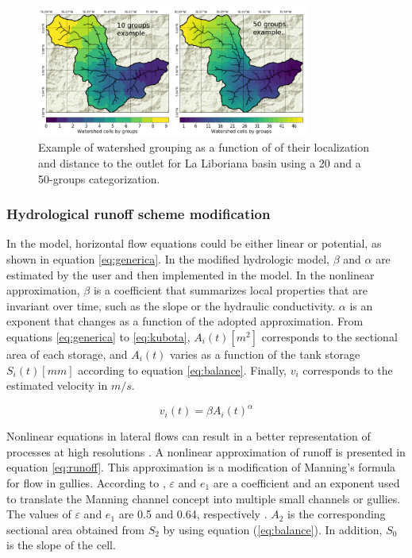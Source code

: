 \documentclass[hess, manuscript]{copernicus}
\begin{document}
\begin{figure}[t!]
\centering
 \includegraphics[width=9cm]{Figures/Mapas_Grupos.png}
 \caption{Example of watershed grouping as a function of of their localization and distance to the outlet for La Liboriana basin using a 20 and a 50-groups categorization.}
    \label{fig:groupsexample}
\end{figure}


\subsubsection{Hydrological runoff scheme modification}

In the model, horizontal flow equations could be either linear or potential, as shown in equation \ref{eq:generica}. In the modified hydrologic model, $\beta$ and $\alpha$ are estimated by the user and then implemented in the model. In the nonlinear approximation, $\beta$ is a coefficient that summarizes local properties that are invariant over time, such as the slope or the hydraulic conductivity. $\alpha$ is an exponent that changes as a function of the adopted approximation. From equations \ref{eq:generica} to \ref{eq:kubota}, $A_i(t) [m^2]$ corresponds to the sectional area of each storage, and $A_i(t)$ varies as a function of the tank storage $S_i(t) [mm]$ according to equation \ref{eq:balance}. Finally, $v_{i}$ corresponds to the estimated velocity in $m/s$.

\begin{equation}
 v_{i}(t) = \beta A_i(t) ^{\alpha} 
    \label{eq:generica}
\end{equation}

Nonlinear equations in lateral flows can result in a better representation of processes at high resolutions \citep{Beven1981, Kirkby1967}.  A nonlinear approximation of runoff is presented in equation \ref{eq:runoff}. This approximation is a modification of Manning's formula for flow in gullies. According to \citet{Foster1984}, $\varepsilon$ and $e_1$ are a coefficient and an exponent used to translate the Manning channel concept into multiple small channels or gullies. The values of $\varepsilon$ and $e_1$ are 0.5 and 0.64, respectively \citep{Foster1984}. $A_2$ is the corresponding sectional area obtained from $S_2$ by using equation (\ref{eq:balance}). In addition, $S_0$ is the slope of the cell.\\     
\end{document}

